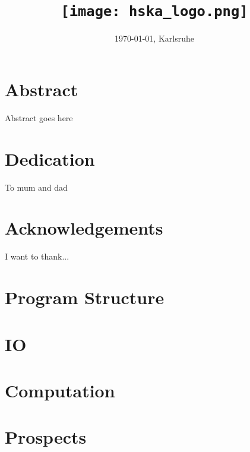 \documentclass[12pt, oneside]{report}
\title{
	{\GetTitle{}}\\
	{\texttt{[image: hska\_logo.png]}}
}
\author{\GetAuthor{}}
\date{\today{}, Karlsruhe}
\begin{document}
\newpage
\listoftodos[Notes]
\newpage

\maketitle
\setcounter{page}{1}

\chapter*{Abstract}
Abstract goes here

\chapter*{Dedication}
To mum and dad

\chapter*{Acknowledgements}
I want to thank...


\tableofcontents


\chapter{Program Structure}


\chapter{IO}


\chapter{Computation}


\chapter{Prospects}




\appendix

\end{document}
